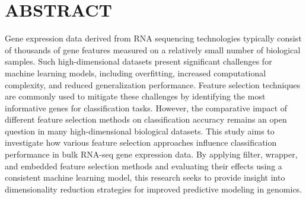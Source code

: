 \chapter*{ABSTRACT}
\onehalfspacing
   Gene expression data derived \citep{kumar2014feature} from RNA sequencing technologies typically consist of thousands of gene features measured on a relatively small number of biological samples.
    Such high-dimensional datasets present significant challenges for machine learning models, including overfitting, increased computational complexity, and reduced generalization performance. Feature selection techniques are commonly used to mitigate these challenges by identifying the most informative genes for classification tasks. However, the comparative impact of different feature selection methods on classification accuracy remains an open question in many high-dimensional biological datasets. This study aims to investigate how various feature selection approaches influence classification performance in bulk RNA-seq gene expression data. By applying filter, wrapper, and embedded feature selection methods and evaluating their effects using a consistent machine learning model, this research seeks to provide insight into dimensionality reduction strategies for improved predictive modeling in genomics.
